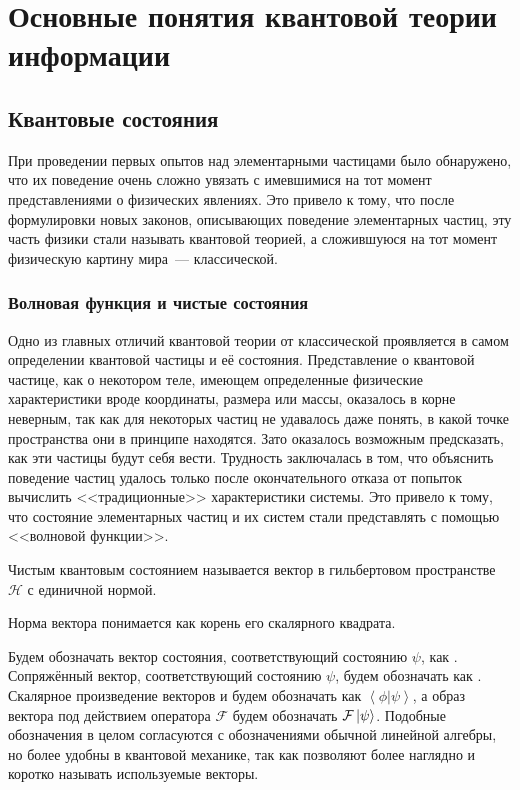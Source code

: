 \section{Основные понятия квантовой теории информации}
\subsection{Квантовые состояния}
При проведении первых опытов над элементарными частицами было обнаружено, что их поведение очень сложно увязать с имевшимися на тот момент представлениями о физических явлениях. Это привело к тому, что после формулировки новых законов, описывающих поведение элементарных частиц, эту часть физики стали называть квантовой теорией, а сложившуюся на тот момент физическую картину мира~--- классической.

\subsubsection{Волновая функция и чистые состояния}
Одно из главных отличий квантовой теории от классической проявляется в самом определении квантовой частицы и её состояния.
Представление о квантовой частице, как о некотором теле, имеющем определенные физические характеристики вроде координаты, размера или массы, оказалось в корне неверным, так как для некоторых частиц не удавалось даже понять, в какой точке пространства они в принципе находятся. Зато оказалось возможным предсказать, как эти частицы будут себя вести.
Трудность заключалась в том, что объяснить поведение частиц удалось только после окончательного отказа от попыток вычислить <<традиционные>> характеристики системы. Это привело к тому, что состояние элементарных частиц и их систем стали представлять с помощью <<волновой функции>>.

\begin{definition}
  Чистым квантовым состоянием называется вектор в гильбертовом пространстве $\mathcal H$ с единичной нормой.
\end{definition}
Норма вектора понимается как корень его скалярного квадрата.

Будем обозначать вектор состояния, соответствующий состоянию $\psi$, как \state{\psi}. 
Сопряжённый вектор, соответствующий состоянию $\psi$, будем обозначать как \conjstate{\psi}. 
Скалярное произведение векторов \state{\psi}  и \conjstate{\phi}  будем обозначать как $\left\langle\phi|\psi\right\rangle$, 
а образ вектора \state{\psi} под действием оператора $\mathcal F$ будем обозначать $\mathcal F\left| \psi \right\rangle$. 
Подобные обозначения в целом согласуются с обозначениями обычной линейной алгебры, но более удобны в квантовой механике, так как позволяют более наглядно и коротко называть используемые векторы.

